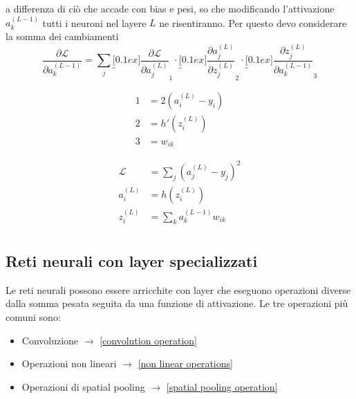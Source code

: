 \vskip3mm
 a differenza di ciò che accade con bias e pesi, so che modificando l'attivazione $ a_{k}^{\left(L-1\right)} $ tutti i neuroni nel layere $ L $ ne risentiranno. Per questo devo considerare la somma dei cambiamenti
\[
	\frac{\partial \mathcal{L}}{\partial a_k^{(L-1)}} =
	\sum_{j}
	\underbracket[0.1ex]{  \frac{\partial \mathcal{L}}{\partial a_j^{(L)}} }_{1}
	\cdot
	\underbracket[0.1ex]{  \frac{\partial a_j^{(L)}}{\partial z_j^{(L)}}}_{2}
	\cdot
	\underbracket[0.1ex]{  \frac{\partial z_j^{(L)}}{\partial a_k^{(L-1)}}}_{3}
\]
\vskip0mm
\begin{minipage}[t]{0.48\textwidth}
	\begin{align*}
		1 & = 2\left(a_i^{\left(L\right)} - y_i\right) \\
		2 & = h'\left(z_i^{\left(L\right)}\right)      \\
		3 & = w_{ik}
	\end{align*}
\end{minipage}
%
\begin{minipage}[t]{0.48\textwidth}
	\begin{align*}
		\mathcal{L}          & = \sum_{j} \left(a_j^{\left(L\right)} - y_j\right)^2 \\
		a_i^{\left(L\right)} & = h\left(z_i^{\left(L\right)}\right)                 \\
		z_i^{\left(L\right)} & = \sum_{k} a_k ^{\left(L-1\right)} w_{ik}            \\
	\end{align*}
\end{minipage}


\subsection{Reti neurali con layer specializzati}
Le reti neurali possono essere arricchite con layer che eseguono operazioni diverse dalla somma pesata seguita da una funzione di attivazione. Le tre operazioni più comuni sono:
\begin{itemize}
	\item Convoluzione $ \rightarrow  $ \cref{convolution operation}
	\item Operazioni non lineari $ \rightarrow  $ \cref{non linear operations}
	\item Operazioni di spatial pooling $ \rightarrow  $ \cref{spatial pooling operation}
\end{itemize}


